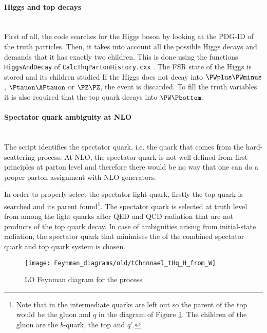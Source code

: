 \paragraph{Higgs and top decays}\mbox{}\\
First of all, the code searches for the Higgs boson by looking at the PDG-ID of the truth 
particles. Then, it takes into account all the possible Higgs decays 
and demands that it has exactly two children. 
This is done using the functions \texttt{HiggsAndDecay} of \texttt{CalcThqPartonHistory.cxx} .
The FSR state of the Higgs is stored and its children studied
If the Higgs does not decay into 
$\PWplus\PWminus$, $\Ptauon \APtauon$ or $\PZ\PZ$, the event is discarded. 
To fill the truth variables it is also required that the top quark decays into $\PW \Pbottom$.


\paragraph{Spectator quark ambiguity at NLO}\mbox{}\\
The script identifies the
spectator quark, i.e. the quark that comes from the hard-scattering process.
At NLO, the spectator quark is not well defined from first principles at parton level 
and therefore there would be no way that one can do a proper parton assignment with NLO generators.

In order to properly select the spectator light-quark, firstly the top quark is searched and its parent found\footnote{%
Note that in \PYTHIA the intermediate quarks are left out so the parent of the top would be the gluon and $q$ in the 
diagram of Figure \ref{fig:tHq:TruthFeyman:HfromW}.
The children of the gluon are the $b$-quark, the top and $q'$.}. 
The spectator quark is selected at truth level from among the light quarks after QED and QCD radiation that are not products of the top quark decay. In case of ambiguities arising from initial-state radiation, the spectator quark that minimises the \pT of the combined spectator quark and top quark system is chosen.

\begin{figure}[htbp!]
\centering
\texttt{[image: Feynman\_diagrams/old/tChnnnael\_tHq\_H\_from\_W]}
\caption{LO Feynman diagram for the \tHq process}
\label{fig:tHq:TruthFeyman:HfromW}
\end{figure}

